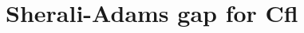 \documentclass[11pt]{article}
\newcommand{\lbfl}{{\sc Lbfl}}
\newcommand{\cfl}{{\sc Cfl}}
\begin{document}
\begin{comment}  The second well-known LP  is the star relaxation.
A {\em star} is a set consisting of some  clients and
one facility. Let $\mathcal{S}$ be a set of stars. For a star  $s\in \mathcal{S},$ let  $x_s$ be an indicator variable denoting
whether  $s$ is picked.   The cost  $c_s$ of star $s$   is equal
to the opening cost of the corresponding facility plus the cost of
connecting the star's clients to it. 
\iffalse \[ \begin{array}{ccccc}
& \min \sum_{s\in \mathcal{S}} c_sx_{s}   &  \\
\sum_{s \ni  j } x_s = 1   \;\; \forall j \in C  & &
\sum_{s \ni  i } x_s \leq  1  \;\;  \forall i \in F  &  & 
x_s \geq 0         \;\;  \text{for all stars } s \in \mathcal{S}  
\end{array}  \]    \fi
\[ \min \{ \sum_{s} c_sx_{s} \mid \sum_{s \ni  j } x_s = 1   \;\;
\forall j \in C, \;\;\;  \sum_{s \ni  i } x_s \leq  1  \;\;  \forall i \in F,
\;\;\; x_s \geq 0         \;\;  \text{for all stars } s \in \mathcal{S}   \} \]

Defining $\mathcal{S}$ as the set of all stars $s$ where  the total number of the clients in $s$ 
is at most the
capacity $U$ (at least the bound $B$),  we get corresponding relaxations for
  \cfl\ (\lbfl).
In the rest of the paper we  slightly abuse terminology by 
using    {\em (LP-star)}  to refer to the
star relaxation for the problem we examine each time (\cfl\  or \lbfl).

It is well known  that for both \cfl\ and \lbfl, (LP-classic) and (LP-star) are
equivalent, therefore (LP-star) can be solved in  polynomial time.
\end{comment}   






\section{Sherali-Adams gap for \cfl }\label{SA-result}
\end{document}
